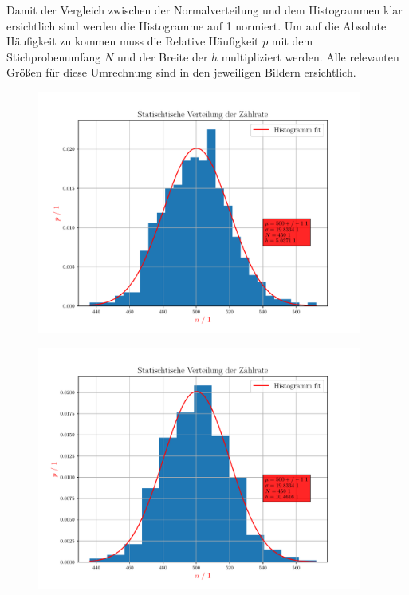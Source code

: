 \documentclass[12pt,english,ngerman]{scrartcl}
\begin{document}
Damit der Vergleich zwischen der Normalverteilung und dem Histogrammen 
klar ersichtlich sind werden die Histogramme auf 1 normiert. Um auf die
Absolute Häufigkeit zu kommen muss die Relative Häufigkeit $p$ mit dem
Stichprobenumfang $N$ und der Breite der $h$ multipliziert werden. Alle
relevanten Größen für diese Umrechnung sind in den jeweiligen Bildern
ersichtlich.
\begin{figure}[H]
  \begin{center}
    \includegraphics[width=0.95\textwidth]{./figures/5statistik.pdf}
  \end{center}
  \caption{}
  \label{fig:5statistik}
\end{figure}

\begin{figure}[H]
  \begin{center}
    \includegraphics[width=0.95\textwidth]{./figures/10statistik.pdf}
  \end{center}
  \caption{}
  \label{fig:10statistik}
\end{figure}
\end{document}

